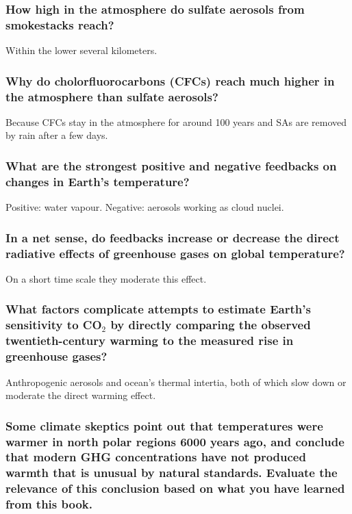\subsubsection{How high in the atmosphere do sulfate aerosols from smokestacks
reach?}

Within the lower several kilometers.

\subsubsection{Why do cholorfluorocarbons (CFCs) reach much higher in the
atmosphere than sulfate aerosols?}

Because CFCs stay in the atmosphere for around 100 years and SAs are removed by
rain after a few days.

\subsubsection{What are the strongest positive and negative feedbacks on
changes in Earth's temperature?}

Positive: water vapour. Negative: aerosols working as cloud nuclei.

\subsubsection{In a net sense, do feedbacks increase or decrease the direct
radiative effects of greenhouse gases on global temperature?}

On a short time scale they moderate this effect.

\subsubsection{What factors complicate attempts to estimate Earth's sensitivity
to CO$_2$ by directly comparing the observed twentieth-century warming to the
measured rise in greenhouse gases?}

Anthropogenic aerosols and ocean's thermal intertia, both of which slow down
or moderate the direct warming effect.

\subsubsection{Some climate skeptics point out that temperatures were warmer in
north polar regions 6000 years ago, and conclude that modern GHG concentrations
have not produced warmth that is unusual by natural standards. Evaluate the
relevance of this conclusion based on what you have learned from this book.}


